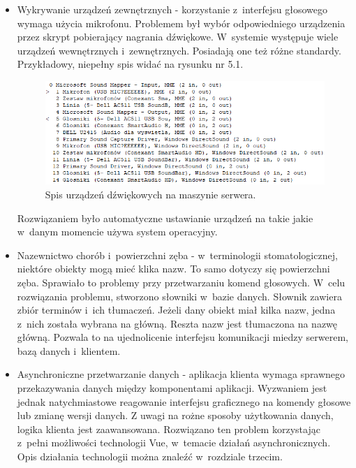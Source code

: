 \begin{itemize}
    \item Wykrywanie urządzeń zewnętrznych - korzystanie z~interfejsu głosowego wymaga użycia mikrofonu. Problemem był wybór odpowiedniego urządzenia przez skrypt pobierający nagrania dźwiękowe. W~systemie występuje wiele urządzeń wewnętrznych i~zewnętrznych. Posiadają one też różne standardy. Przykładowy, niepełny spis widać na rysunku nr 5.1.
    \begin{figure}[ht!]
    \centering\includegraphics[width=145mm,scale=1.5]{figures/devices.PNG}
    \caption{Spis urządzeń dźwiękowych na maszynie serwera.}
    \label{fig:devices}
    \end{figure}
    
    Rozwiązaniem było automatyczne ustawianie urządzeń na takie jakie w~danym momencie używa system operacyjny.
    \item Nazewnictwo chorób i~powierzchni zęba - w~terminologii stomatologicznej, niektóre obiekty mogą mieć klika nazw. To samo dotyczy się powierzchni zęba. Sprawiało to problemy przy przetwarzaniu komend głosowych. W~celu rozwiązania problemu, stworzono słowniki w~bazie danych. Słownik zawiera zbiór terminów i~ich tłumaczeń. Jeżeli dany obiekt miał kilka nazw, jedna z~nich została wybrana na główną. Reszta nazw jest tłumaczona na nazwę główną. Pozwala to na ujednolicenie interfejsu komunikacji miedzy serwerem, bazą danych i~klientem.
    \item Asynchroniczne przetwarzanie danych - aplikacja klienta wymaga sprawnego przekazywania danych między komponentami aplikacji. Wyzwaniem jest jednak natychmiastowe reagowanie interfejsu graficznego na komendy głosowe lub zmianę wersji danych. Z uwagi na rożne sposoby użytkowania danych, logika klienta jest zaawansowana. Rozwiązano ten problem korzystając z~pełni możliwości technologii Vue, w~temacie działań asynchronicznych. Opis działania technologii można znaleźć w~rozdziale trzecim. 
\end{itemize}

